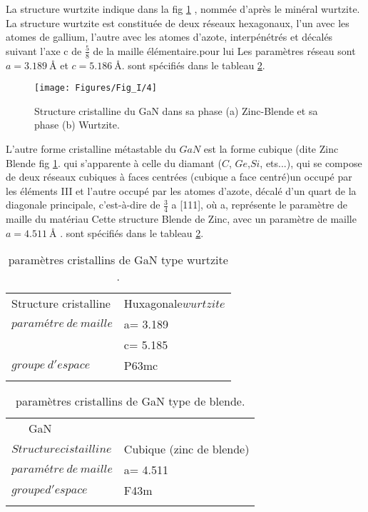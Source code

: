 La structure wurtzite indique dans la fig \ref{fig:4} , nommée d'après le minéral wurtzite. La structure wurtzite est constituée de deux réseaux hexagonaux, l'un avec les atomes de gallium, l'autre avec les atomes d'azote, interpénétrés et décalés suivant l'axe c de $ \frac{5}{8} $ 
de la maille élémentaire.pour lui Les paramètres réseau sont $a = \SI{3.189}{\angstrom}$ et $c = \SI{5.186}{\angstrom}$\cite{a6}.  sont spécifiés dans le tableau \ref{GaN-wz}.

  \begin{figure}[h!]
  	\centering
  	\texttt{[image: Figures/Fig\_I/4]}
  	\caption{Structure cristalline du GaN dans sa phase (a) Zinc-Blende et sa phase (b) Wurtzite.}
  	\label{fig:4}
  \end{figure}


L’autre forme cristalline métastable du $ GaN $ est la forme cubique (dite Zinc Blende fig \ref{fig:4}. qui s'apparente à celle du diamant ($ C $, $ Ge $,$ Si $, ets...), qui se compose de deux réseaux cubiques à faces centrées (cubique a face centré)un occupé par les éléments III et l’autre occupé par les atomes d’azote, décalé d’un quart de la diagonale principale, c'est-à-dire de $ \frac{3}{4} $ a [111], où a, représente le paramètre de maille du matériau Cette structure Blende de Zinc, avec un paramètre de maille $a = \SI{4.511}{\angstrom}$ \cite{a8}.   sont spécifiés dans le tableau \ref{GaN-wz}.

\begin{table}
	\centering
	\begin{tabular}{ll}
		\hline\noalign{\smallskip}
		Structure cristalline & Huxagonale$ wurtzite $ \\
		\noalign{\smallskip}\hline\noalign{\smallskip}
		$ paramétre~ de~ maille $ & a= 3.189 \\
		~~~~~~ & c= 5.185 \\
		 $ groupe~ d'espace $ & P63mc  \\
		\noalign{\smallskip}\hline
	\end{tabular}
	\caption{paramètres cristallins de GaN type wurtzite \cite{a7} .}
	\label{GaN-wz} 
\end{table} 

\begin{table}
	\centering
	\begin{tabular}{ll}
		\hline\noalign{\smallskip}
		~~~GaN~~~ & \\
		\noalign{\smallskip}\hline\noalign{\smallskip}
		$ Structure cistailline $ & Cubique (zinc de blende) \\
	$ paramétre~ de~ maille $ & a= 4.511 \\
$ groupe d'espace $ & F43m \\
		\noalign{\smallskip}\hline
	\end{tabular}
	\caption{paramètres cristallins de GaN type de blende\cite {a8}.}
	\label{GaN-wz}
\end{table} 
